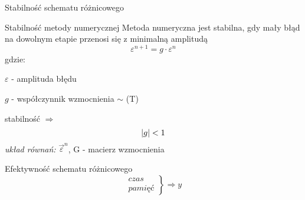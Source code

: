 \begin{frame}{Stabilność schematu różnicowego}
  \begin{block}{Stabilność metody numerycznej}
    Metoda numeryczna jest stabilna, gdy mały błąd na dowolnym etapie przenosi się z minimalną amplitudą
    $$\varepsilon^{n+1} = g \cdot \varepsilon^{n}$$
    gdzie: \par
    \quad $\varepsilon$ - amplituda błędu \par
    \quad $g$ - współczynnik wzmocnienia $\sim$ (T)
  \end{block}
  stabilność $\Rightarrow $ \[\abs{g} < 1\]
  \textit{układ równań:} $\vec{\varepsilon}^{n}$, G  - macierz wzmocnienia
\end{frame}
\begin{frame}{Efektywność schematu różnicowego}
$$\begin{array}{ll}
czas \\
\textit{pamięć}
\end{array} \left.\right\} \Rightarrow y$$
\end{frame}

